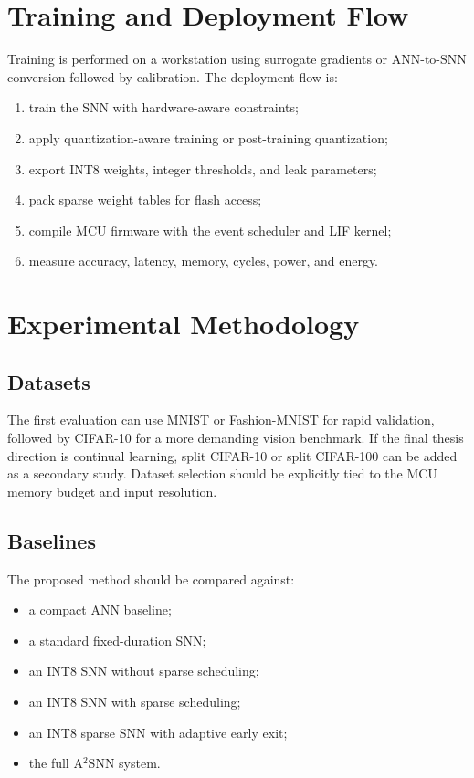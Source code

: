 \documentclass[journal]{IEEEtran}
\newcommand{\modelname}{A$^2$SNN}
\begin{document}
\section{Training and Deployment Flow}
Training is performed on a workstation using surrogate gradients or ANN-to-SNN conversion followed by calibration. The deployment flow is:
\begin{enumerate}
    \item train the SNN with hardware-aware constraints;
    \item apply quantization-aware training or post-training quantization;
    \item export INT8 weights, integer thresholds, and leak parameters;
    \item pack sparse weight tables for flash access;
    \item compile MCU firmware with the event scheduler and LIF kernel;
    \item measure accuracy, latency, memory, cycles, power, and energy.
\end{enumerate}

\section{Experimental Methodology}
\subsection{Datasets}
The first evaluation can use MNIST or Fashion-MNIST for rapid validation, followed by CIFAR-10 for a more demanding vision benchmark. If the final thesis direction is continual learning, split CIFAR-10 or split CIFAR-100 can be added as a secondary study. Dataset selection should be explicitly tied to the MCU memory budget and input resolution.

\subsection{Baselines}
The proposed method should be compared against:
\begin{itemize}
    \item a compact ANN baseline;
    \item a standard fixed-duration SNN;
    \item an INT8 SNN without sparse scheduling;
    \item an INT8 SNN with sparse scheduling;
    \item an INT8 sparse SNN with adaptive early exit;
    \item the full \modelname{} system.
\end{itemize}
\end{document}
